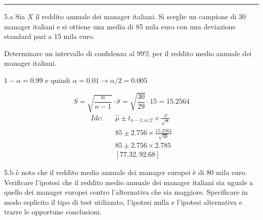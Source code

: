 \documentclass[
  11pt,
]{book}
\theoremstyle{mytheoremstyle}
\theoremstyle{mydefstyle}
\newenvironment{sol}
  {
  \begin{tcolorbox}[enhanced,breakable,arc=0.1mm,boxrule=1pt,colback=white,colframe=iblue,
  title=\bf \fontfamily{lmss}\selectfont \hspace{.5 cm} Soluzione,drop fuzzy shadow]

}{
\end{tcolorbox}
  }
\begin{document}
\begin{center}\rule{0.5\linewidth}{0.5pt}\end{center}

5.a Sia \(X\) il reddito annuale dei manager italiani.
Si sceglie un campione di 30 manager italiani e si ottiene una
media di 85 mila euro con una deviazione standard pari a 15 mila euro.

Determinare un intervallo di confidenza al 99\% per
il reddito medio annuale dei manager italiani.

\begin{sol}
\(1-\alpha =0.99\) e quindi \(\alpha=0.01\rightarrow \alpha/2=0.005\)

\[
      S  =\sqrt{\frac {n}{n-1}}\cdot\hat\sigma =
     \sqrt{\frac { 30 }{ 29 }}\cdot 15 = 15.2564 
\]
\begin{eqnarray*}
  Idc: & &  \hat\mu \pm  t_{n-1;\alpha/2} \times \frac{S}{\sqrt{n}} \\
     & &  85 \pm  2.756 \times \frac{ 15.2564 }{\sqrt{ 30 }} \\
     & &  85 \pm  2.756 \times  2.785 \\
     & & [ 77.32 ,  92.68 ]
\end{eqnarray*}

\end{sol}

5.b è noto che il reddito medio annuale dei manager europei
è di 80 mila euro.
Verificare l'ipotesi
che il reddito medio annuale dei manager italiani sia uguale a quello
dei manager europei contro l'alternativa che sia maggiore.
Specificare in modo esplicito il tipo di test utilizzato,
l'ipotesi nulla e l'ipotesi alternativa e trarre le opportune
conclusioni.
\end{document}
